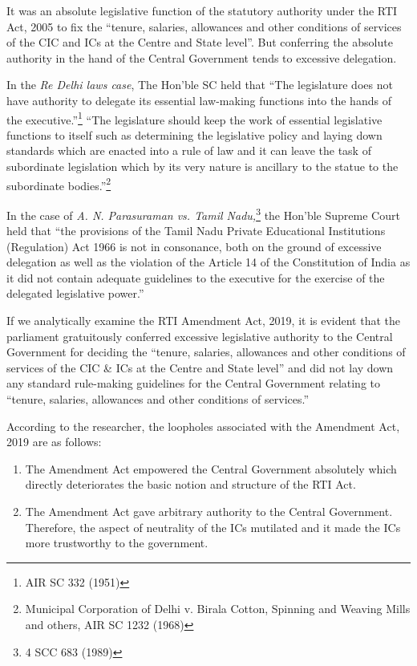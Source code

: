 \begin{multicols}{2}
\noi
It was an absolute legislative function of the statutory authority under the RTI Act, 2005 to
fix the “tenure, salaries, allowances and other conditions of services of the CIC and ICs at the
Centre and State level”. But conferring the absolute authority in the hand of the Central
Government tends to excessive delegation.

\noi
In the \textit{Re Delhi laws case}, The Hon’ble SC held that “The legislature does not have authority
to delegate its essential law-making functions into the hands of the executive.”\footnote{AIR SC 332 (1951)} “The
legislature should keep the work of essential legislative functions to itself such as
determining the legislative policy and laying down standards which are enacted into a rule of
law and it can leave the task of subordinate legislation which by its very nature is ancillary to
the statue to the subordinate bodies.”\footnote{Municipal Corporation of Delhi v. Birala Cotton, Spinning and Weaving Mills and others, AIR SC 1232 (1968)}

\noi
In the case of \textit{A. N. Parasuraman vs. Tamil Nadu,}\footnote{4 SCC 683 (1989)} the Hon’ble Supreme Court held that “the
provisions of the Tamil Nadu Private Educational Institutions (Regulation) Act 1966 is not in
consonance, both on the ground of excessive delegation as well as the violation of the Article
14 of the Constitution of India as it did not contain adequate guidelines to the executive for
the exercise of the delegated legislative power.”

\noi
If we analytically examine the RTI Amendment Act, 2019, it is evident that the parliament
gratuitously conferred excessive legislative authority to the Central Government for deciding
the “tenure, salaries, allowances and other conditions of services of the CIC \& ICs at the 
Centre and State level” and did not lay down any standard rule-making guidelines for the
Central Government relating to “tenure, salaries, allowances and other conditions of
services.”


\noi
According to the researcher, the loopholes associated with the Amendment Act, 2019 are as
follows:

\begin{enumerate}
\item The Amendment Act empowered the Central Government absolutely which directly
deteriorates the basic notion and structure of the RTI Act.

\item The Amendment Act gave arbitrary authority to the Central Government. Therefore,
the aspect of neutrality of the ICs mutilated and it made the ICs more trustworthy to
the government.


\end{enumerate}
\end{multicols}
